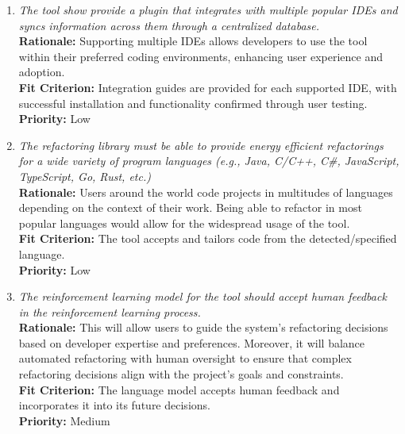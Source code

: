 \documentclass[12pt]{article}
\begin{document}
\begin{enumerate}[label=WTRM \arabic*., wide=0pt, leftmargin=*]
    {\bf Rationale:} This would help users better understand the impact of refactoring on both energy consumption and performance.\\
    {\bf Fit Criterion:} Users are able to access energy metrics for all their projects on a centralized platform.\\
    {\bf Priority:} High
  \item \emph{The tool show provide a plugin that integrates with multiple popular IDEs and syncs information across them through a centralized database.}\\[2mm]
    {\bf Rationale:} Supporting multiple IDEs allows developers to use the tool within their preferred coding environments, enhancing user experience and adoption.\\
    {\bf Fit Criterion:} Integration guides are provided for each supported IDE, with successful installation and functionality confirmed through user testing.\\
    {\bf Priority:} Low
  \item \emph{The refactoring library must be able to provide energy efficient refactorings for a wide variety of program languages (e.g., Java, C/C++, C\#, JavaScript, TypeScript, Go, Rust, etc.)}\\[2mm]
    {\bf Rationale:} Users around the world code projects in multitudes of languages depending on the context of their work. Being able to refactor in most popular languages would allow for the widespread usage of the tool.\\
    {\bf Fit Criterion:} The tool accepts and tailors code from the detected/specified language.\\
    {\bf Priority:} Low
  \item \emph{The reinforcement learning model for the tool should accept human feedback in the reinforcement learning process.}\\[2mm]
    {\bf Rationale:} This will allow users to guide the system's refactoring decisions based on developer expertise and preferences. Moreover, it will balance automated refactoring with human oversight to ensure that complex refactoring decisions align with the project's goals and constraints.\\
    {\bf Fit Criterion:} The language model accepts human feedback and incorporates it into its future decisions.\\
    {\bf Priority:} Medium
\end{enumerate}
\end{document}

